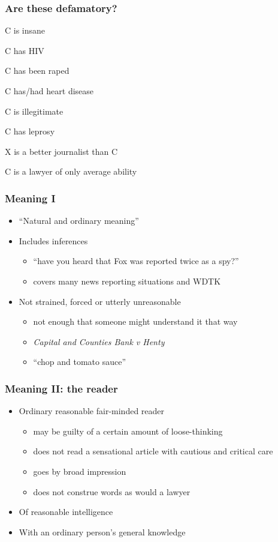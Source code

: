 \documentclass[ignorenonframetext,]{beamer}
\begin{document}
\begin{frame}
\frametitle{Are these defamatory?}
  C is insane

  C has HIV

  C has been raped

  C has/had heart disease

  C is illegitimate

  C has leprosy

  X is a better journalist than C

  C is a lawyer of only average ability

\end{frame}

\begin{frame}
\frametitle{Meaning I}

\begin{itemize}
\item  ``Natural and ordinary meaning''
\item  Includes inferences
  \begin{itemize}
  \item    ``have you heard that Fox was reported twice as a spy?''
  \item    covers many news reporting situations and WDTK
  \end{itemize}
\item  Not strained, forced or utterly unreasonable
  \begin{itemize}
  \item  not enough that someone {might}{ understand it that way}
  \item  {\it Capital and Counties Bank v Henty}
  \item  {``}{chop and tomato sauce''}
  \end{itemize}
\end{itemize}

\end{frame}

\begin{frame}
\frametitle{Meaning II: the reader}


\begin{itemize}
  \item  Ordinary reasonable fair-minded reader

    \begin{itemize}
    \item may be guilty of a certain amount of loose-thinking
    \item does not read a sensational article with cautious and critical care
    \item goes by broad impression
    \item does not construe words as would a lawyer
    \end{itemize}
  \item  Of reasonable intelligence
  \item  With an ordinary person's general knowledge
  \end{itemize}


\end{frame}
\end{document}

